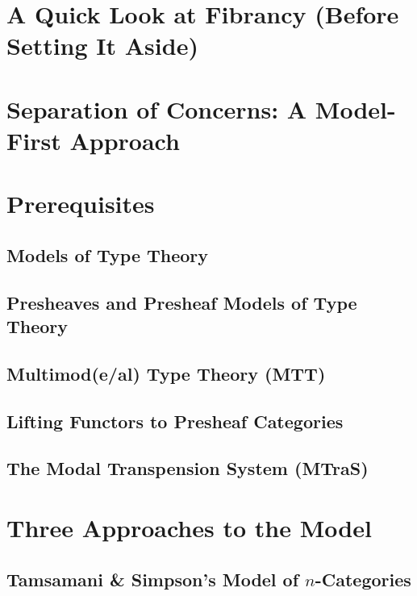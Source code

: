 \documentclass{lmcs} %
\theoremstyle{plain}\newtheorem{satz}[thm]{Satz} %
\theoremstyle{plain}
\theoremstyle{definition}
\begin{document}
\section{A Quick Look at Fibrancy (Before Setting It Aside)}

\section{Separation of Concerns: A Model-First Approach}

\section{Prerequisites}
\subsection{Models of Type Theory}

\subsection{Presheaves and Presheaf Models of Type Theory}

\subsection{Multimod(e/al) Type Theory (MTT)}

\subsection{Lifting Functors to Presheaf Categories}

\subsection{The Modal Transpension System (MTraS)}

\section{Three Approaches to the Model}

\subsection{Tamsamani \& Simpson's Model of $n$-Categories}
\end{document}
